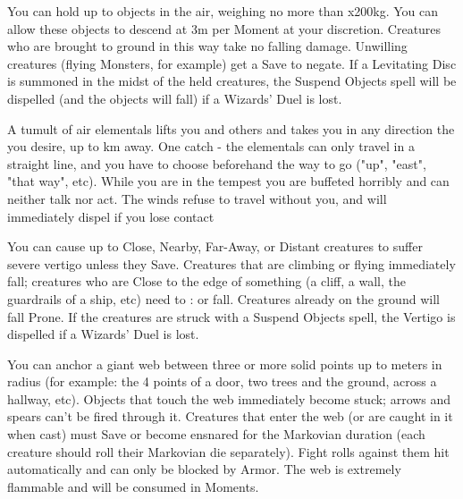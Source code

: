 {You can hold up to \DICE objects in the air, weighing no more than \DICE
x200kg.  You can allow these objects to descend at 3m per Moment at your
discretion. Creatures who are brought to ground in this way take no falling
damage.  Unwilling creatures (flying Monsters, for example) get a Save to
negate.  If a Levitating Disc is summoned in the midst of the held
creatures, the Suspend Objects spell will be dispelled (and the objects will
fall) if a Wizards' Duel is lost.




\SPELL[
  Name=Tempestuous Chariot,
  Link=wizardry-tempestuous-chariot,
  Paradigm=Elements,
  Save=N,
  Duration=One trip,
  Counter=n/a ,
  Keywords=None,
  Target=Close
]



A tumult of air elementals lifts you and  others and takes you in any
direction the you desire, up to \SUMDICE km away.   One catch - the
elementals can only travel in a straight line, and you have to choose
beforehand the way to go ("up", "east", "that way", etc).  While you are in
the tempest you are buffeted horribly and can neither talk nor act.  The
winds refuse to travel without you, and will immediately dispel if you lose
contact




\SPELL[
  Name=Vertigo,
  Link=wizardry-vertigo,
  Paradigm=Mind,
  Save=Y (negate),
  Duration=Markovian,
  Counter=\mylink{Suspend Objects}{wizardry-suspend-objects} ,
  Keywords=None,
  Target= Any Distance
]



You can cause up to \DICE Close, Nearby, Far-Away, or Distant creatures to
suffer severe vertigo unless they Save.  Creatures that are climbing or
flying immediately fall; creatures who are Close to the edge of something (a
cliff, a wall, the guardrails of a ship, etc) need to \RS : \FOC or fall.
Creatures already on the ground will fall Prone.  If the creatures are
struck with a Suspend Objects spell, the Vertigo is dispelled if a Wizards'
Duel is lost.





\SPELL[
  Name=Web,
  Link=wizardry-web,
  Paradigm=Entropy,
  Save=Y (negate),
  Duration=Markovian,
  Counter=n/a ,
  Keywords=None,
  Target=Nearby or Far Away Area
]



You can anchor a giant web between three or more solid points up to \DICE
meters in radius (for example: the 4 points of a door, two trees and the
ground, across a hallway, etc).  Objects that touch the web immediately
become stuck; arrows and spears can't be fired through it.  Creatures that
enter the web (or are caught in it when cast) must Save or become ensnared
for the Markovian duration (each creature should roll their Markovian die
separately). Fight rolls against them hit automatically and can only be
blocked by Armor.  The web is extremely flammable and will be consumed in
\DICE Moments.



}
